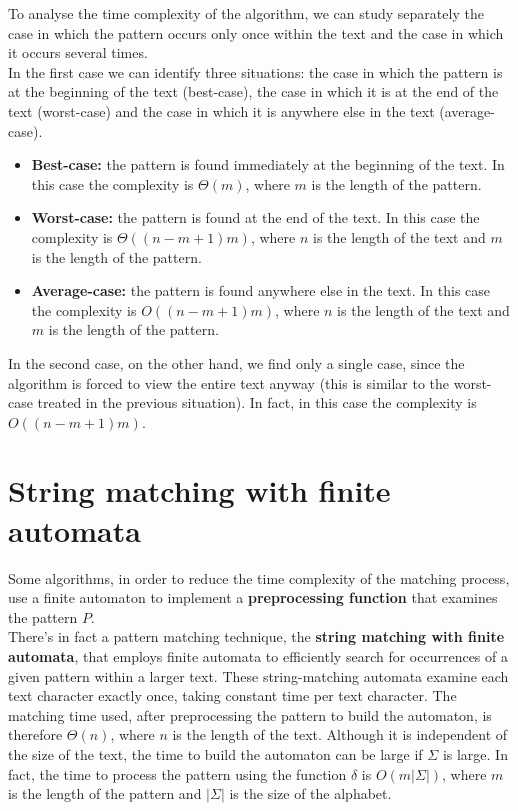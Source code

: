 \documentclass[11pt]{article}
\begin{document}
            To analyse the time complexity of the algorithm, we can study separately the case in which the pattern occurs only once within the text and the case in which it occurs several times. \\
            In the first case we can identify three situations: the case in which the pattern is at the beginning of the text (best-case),
            the case in which it is at the end of the text (worst-case) and the case in which it is anywhere else in the text (average-case).

            \begin{itemize}
                \item \textbf{Best-case:} the pattern is found immediately at the beginning of the text. In this case the complexity is $\Theta(m)$, where $m$ is the length of the pattern.
                \item \textbf{Worst-case:} the pattern is found at the end of the text. In this case the complexity is $\Theta((n - m + 1)m)$, where $n$ is the length of the text and $m$ is the length of the pattern.
                \item \textbf{Average-case:} the pattern is found anywhere else in the text. In this case the complexity is $O((n - m + 1)m)$, where $n$ is the length of the text and $m$ is the length of the pattern.
            \end{itemize}

            \noindent In the second case, on the other hand, we find only a single case, since the algorithm is forced to view the entire text anyway
            (this is similar to the worst-case treated in the previous situation). In fact, in this case the complexity is $O((n - m + 1)m)$. \\

    \section{String matching with finite automata} \label{sec:string_matching_with_finite_automata}

        Some algorithms, in order to reduce the time complexity of the matching process, use a finite automaton to implement a \textbf{preprocessing function} that examines the pattern $P$. \\
        There's in fact a pattern matching technique, the \textbf{string matching with finite automata}, that employs finite automata to efficiently search for occurrences of a given pattern within a larger text.
        These string-matching automata examine each text character exactly once, taking constant time per text character.
        The matching time used, after preprocessing the pattern to build the automaton, is therefore $\Theta(n)$, where $n$ is the length of the text.
        Although it is independent of the size of the text, the time to build the automaton can be large if $\Sigma$ is large.
        In fact, the time to process the pattern using the function $\delta$ is $O(m\lvert\Sigma\rvert)$, where $m$ is the length of the pattern and $\lvert\Sigma\rvert$ is the size of the alphabet. \\
\end{document}
